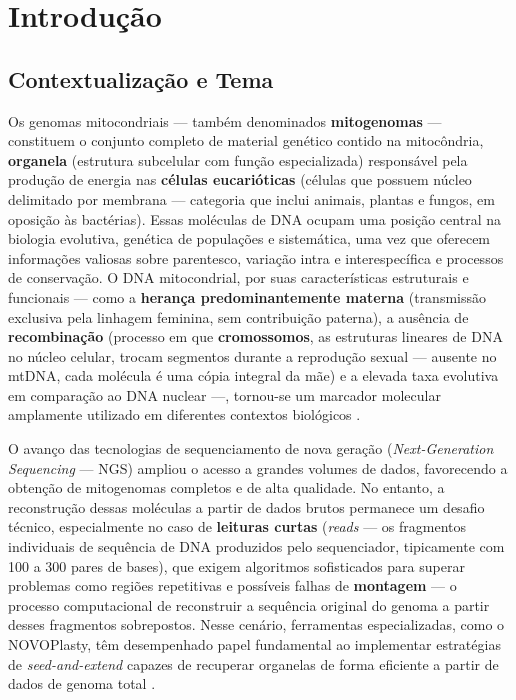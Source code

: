 
\chapter{Introdução}

\section{Contextualização e Tema}

Os genomas mitocondriais --- também denominados \textbf{mitogenomas} --- constituem o conjunto completo de material genético contido na mitocôndria, \textbf{organela} (estrutura subcelular com função especializada) responsável pela produção de energia nas \textbf{células eucarióticas} (células que possuem núcleo delimitado por membrana --- categoria que inclui animais, plantas e fungos, em oposição às bactérias). Essas moléculas de DNA ocupam uma posição central na biologia evolutiva, genética de populações e sistemática, uma vez que oferecem informações valiosas sobre parentesco, variação intra e interespecífica e processos de conservação. O DNA mitocondrial, por suas características estruturais e funcionais --- como a \textbf{herança predominantemente materna} (transmissão exclusiva pela linhagem feminina, sem contribuição paterna), a ausência de \textbf{recombinação} (processo em que \textbf{cromossomos}, as estruturas lineares de DNA no núcleo celular, trocam segmentos durante a reprodução sexual --- ausente no mtDNA, cada molécula é uma cópia integral da mãe) e a elevada taxa evolutiva em comparação ao DNA nuclear ---, tornou-se um marcador molecular amplamente utilizado em diferentes contextos biológicos \cite{boore1999,ekblom2014}.

O avanço das tecnologias de sequenciamento de nova geração (\textit{Next-Generation Sequencing} --- NGS) ampliou o acesso a grandes volumes de dados, favorecendo a obtenção de mitogenomas completos e de alta qualidade. No entanto, a reconstrução dessas moléculas a partir de dados brutos permanece um desafio técnico, especialmente no caso de \textbf{leituras curtas} (\textit{reads} --- os fragmentos individuais de sequência de DNA produzidos pelo sequenciador, tipicamente com 100 a 300 pares de bases), que exigem algoritmos sofisticados para superar problemas como regiões repetitivas e possíveis falhas de \textbf{montagem} --- o processo computacional de reconstruir a sequência original do genoma a partir desses fragmentos sobrepostos. Nesse cenário, ferramentas especializadas, como o NOVOPlasty, têm desempenhado papel fundamental ao implementar estratégias de \textit{seed-and-extend} capazes de recuperar organelas de forma eficiente a partir de dados de genoma total \cite{dierckxsens2017}.

